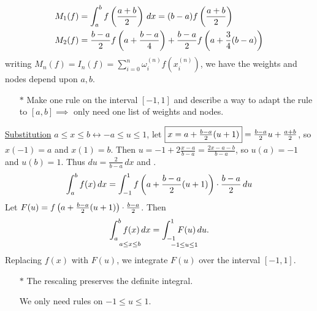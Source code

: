 \documentclass[]{article}
\begin{document}
\begin{observe}
	\begin{align*}
		M_1(f) &= \int_a^b f\left(\frac{a+b}2\right)\,dx = (b-a)f\left(\frac{a+b}2\right) \\
		M_2(f) &= \frac{b-a}2f\left(a+\frac{b-a}4\right)+\frac{b-a}2f\left(a+\frac34(b-a)\right)
	\end{align*}
	writing $M_n(f) = I_n(f) = \sum_{i=0}^n \omega_i^{(n)} f(x_i^{(n)})$, we have the weights and nodes depend upon $a,b$.
\end{observe}
\begin{itemize}
	\item[$*$] Make one rule on the interval $[-1,1]$ and describe a way to adapt the rule to $[a,b] \implies$ only need one list of weights and nodes.
\end{itemize}
\ul{Substitution} $a\leq x\leq b \longleftrightarrow -a\leq u\leq1$, let $\fbox{$x = a+\frac{b-a}2(u+1)$}=\frac{b-a}2u+\frac{a+b}2$, so $x(-1)=a$ and $x(1)=b$.
Then $u = -1+2\frac{x-a}{b-a} = \frac{2x-a-b}{b-a}$, so $u(a)=-1$ and $u(b)=1$.
Thus $du=\frac2{b-a}\,dx$ and .
$$ \int_a^b f(x)\,dx = \int_{-1}^1 f\left(a+\frac{b-a}2(u+1)\right)\cdot\frac{b-a}2\,du$$
Let $F(u) = f\left(a+\frac{b-a}2(u+1)\right)\cdot\frac{b-a}2$.
Then $$ \underset{a\leq x\leq b}{\int_a^b f(x)\,dx}=\underset{-1\leq u\leq1}{\int_{-1}^1 F(u)\,du}.$$
Replacing $f(x)$ with $F(u)$, we integrate $F(u)$ over the interval $[-1,1]$.
\begin{enumerate}
	\item[$*$] The rescaling preserves the definite integral.

		We only need rules on $-1\leq u\leq1$.
\end{enumerate}
\end{document}
